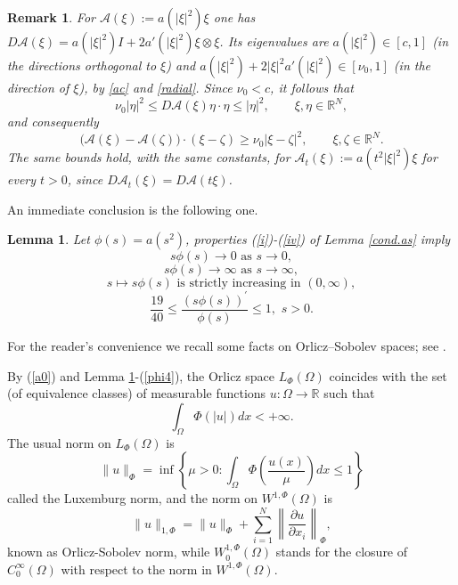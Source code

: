 \documentclass[11pt,leqno]{amsart}
\newtheorem{lemma}[theorem]{Lemma}
\newtheorem{remark}[theorem]{Remark}
\begin{document}
\begin{remark}\label{rem:DA}
For $\mathcal A(\xi):=a(|\xi|^2)\xi$ one has
$D\mathcal A(\xi)=a(|\xi|^2)I+2a'(|\xi|^2)\xi\otimes\xi$. Its eigenvalues
are $a(|\xi|^2)\in[c,1]$ (in the directions orthogonal to $\xi$) and
$a(|\xi|^2)+2|\xi|^2a'(|\xi|^2)\in[\nu_0,1]$ (in the direction of $\xi$),
by \eqref{ac} and \eqref{radial}. Since $\nu_0<c$, it follows that
\begin{equation}\label{DA-bounds}
\nu_0|\eta|^2\le D\mathcal A(\xi)\eta\cdot\eta\le|\eta|^2,
\qquad \xi,\eta\in\mathbb R^N,
\end{equation}
and consequently
\begin{equation}\label{strongmono}
\bigl(\mathcal A(\xi)-\mathcal A(\zeta)\bigr)\cdot(\xi-\zeta)\ge\nu_0|\xi-\zeta|^2,
\qquad \xi,\zeta\in\mathbb R^N.
\end{equation}
The same bounds hold, with the same constants, for
$\mathcal A_t(\xi):=a(t^2|\xi|^2)\xi$ for every $t>0$, since
$D\mathcal A_t(\xi)=D\mathcal A(t\xi)$.
\end{remark}

An immediate conclusion is the following one.

\begin{lemma}\label{cor.as}
	Let $\phi(s)=a(s^2)$, properties (\ref{i})-(\ref{iv}) of Lemma \ref{cond.as} imply
\begin{equation}\label{phi1}
s \phi(s) \rightarrow 0 \mbox{ as } s \rightarrow 0, 
\end{equation}
\begin{equation}\label{phi2}
	s \phi(s) \rightarrow \infty \mbox{ as } s \rightarrow \infty,
\end{equation}
 \begin{equation}\label{phi3}
 s \mapsto s \phi(s) \mbox{ is strictly increasing in } (0, \infty), 
 \end{equation}
\begin{equation}\label{phi4}
			\frac{19}{40}\leq \frac{(s \phi(s))^{\prime}}{\phi(s)} \leq 1, \,\, s>0.
\end{equation}		
\end{lemma}


For the reader's convenience we recall some facts on Orlicz--Sobolev spaces; see \cite{RR}.
	
\noindent By (\ref{a0}) and Lemma \ref{cor.as}-(\ref{phi4}), the Orlicz space $L_{\Phi}(\Omega)$ coincides with the set (of equivalence classes) of measurable functions $u: \Omega \rightarrow \mathbb{R}$ such that
	\begin{equation}\label{Orl}
		\int_{\Omega} \Phi(|u|) dx<+\infty.
	\end{equation}
The usual norm on $L_{\Phi}(\Omega)$ is
	$$
	\|u\|_{\Phi}=\inf \left\{\mu>0: \int_{\Omega} \Phi\left(\frac{u(x)}{\mu}\right) d x \leq 1\right\}
	$$
	called the Luxemburg norm, and the norm on $W^{1, \Phi}(\Omega)$ is
	$$
	\|u\|_{1, \Phi}=\|u\|_{\Phi}+\sum_{i=1}^{N}\left\|\frac{\partial u}{\partial x_{i}}\right\|_{\Phi},
	$$
	known as Orlicz-Sobolev norm, while $W_{0}^{1, \Phi}(\Omega)$ stands for the closure of $C_{0}^{\infty}(\Omega)$ with respect to the norm in $W^{1, \Phi}(\Omega)$. %
	
\end{document}
